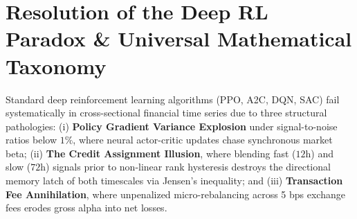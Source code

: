 \documentclass[10pt,a4paper]{article}
\begin{document}
\section{Resolution of the Deep RL Paradox \& Universal Mathematical Taxonomy}

Standard deep reinforcement learning algorithms (PPO, A2C, DQN, SAC) fail systematically in cross-sectional financial time series due to three structural pathologies: (i) \textbf{Policy Gradient Variance Explosion} under signal-to-noise ratios below $1\%$, where neural actor-critic updates chase synchronous market beta; (ii) \textbf{The Credit Assignment Illusion}, where blending fast ($12\text{h}$) and slow ($72\text{h}$) signals prior to non-linear rank hysteresis destroys the directional memory latch of both timescales via Jensen's inequality; and (iii) \textbf{Transaction Fee Annihilation}, where unpenalized micro-rebalancing across 5 bps exchange fees erodes gross alpha into net losses.
\end{document}
